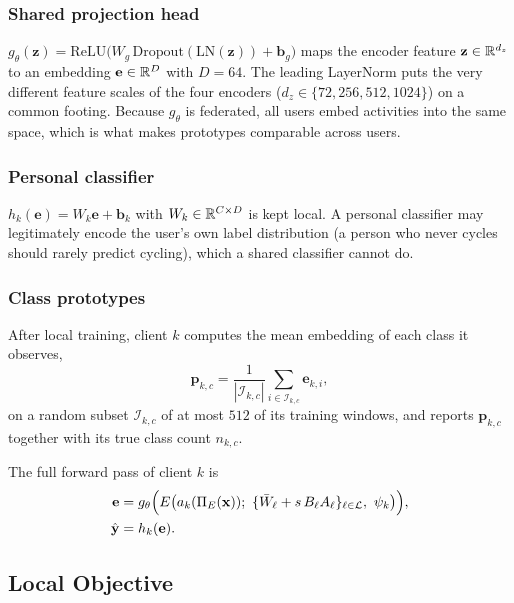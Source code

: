 \subsubsection{Shared projection head }
$g_\theta(\mathbf{z})=\mathrm{ReLU}\big(W_g\,\mathrm{Dropout}(\mathrm{LN}(\mathbf{z}))+\mathbf{b}_g\big)$
maps the encoder feature $\mathbf{z}\in\mathbb{R}^{d_z}$ to an embedding $\mathbf{e}\in\mathbb{R}^{D}$ with $D=64$.
The leading LayerNorm puts the very different feature scales of the four encoders
($d_z\in\{72,256,512,1024\}$) on a common footing. Because $g_\theta$ is federated, all users embed
activities into the same space, which is what makes prototypes comparable across users.

\subsubsection{Personal classifier }
$h_k(\mathbf{e})=W_k\mathbf{e}+\mathbf{b}_k$ with $W_k\in\mathbb{R}^{C\times D}$ is kept local. A personal
classifier may legitimately encode the user's own label distribution (a person who never cycles
should rarely predict cycling), which a shared classifier cannot do.

\subsubsection{Class prototypes }
After local training, client $k$ computes the mean embedding of each class it observes,
\begin{equation}\label{eq:local-proto}
  \mathbf{p}_{k,c}=\frac{1}{|\mathcal{I}_{k,c}|}\sum_{i\in\mathcal{I}_{k,c}}\mathbf{e}_{k,i},
\end{equation}
on a random subset $\mathcal{I}_{k,c}$ of at most $512$ of its training windows, and reports
$\mathbf{p}_{k,c}$ together with its true class count $n_{k,c}$.

The full forward pass of client $k$ is
\begin{equation}\label{eq:forward}
\begin{aligned}
  \mathbf{e}&=g_\theta\Big(E\big(a_k(\Pi_E(\mathbf{x}));\ \{\Wbar_\ell+s\,B_\ell A_\ell\}_{\ell\in\Lset},\ \psi_k\big)\Big),\\
  \hat{\mathbf{y}}&=h_k(\mathbf{e}).
\end{aligned}
\end{equation}

\subsection{Local Objective}\label{sec:method:objective}

